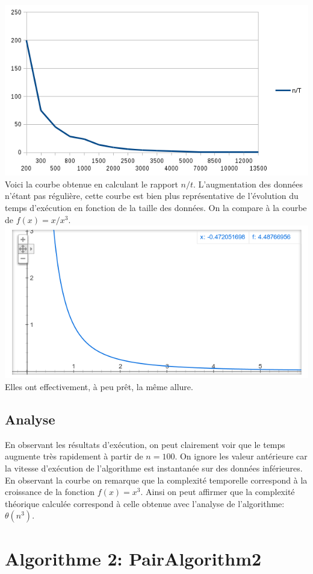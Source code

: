 \documentclass[a4paper, 12pt]{article}
\begin{document}
\begin{minipage}[c]{0.6\linewidth}
	\includegraphics[scale=0.6]{curve_algo_1.png}
 	Voici la courbe obtenue en calculant le rapport $n/t$. L'augmentation des données n'étant pas régulière, cette courbe est bien plus représentative de l'évolution du temps d'exécution en fonction de la taille des données.
 	On la compare à la courbe de $f(x)=x/x^3$.
 	\includegraphics[scale=0.4]{x_x3.png}
 	Elles ont effectivement, à peu prêt, la même allure. 
\end{minipage}
\subsection{Analyse}
En observant les résultats d’exécution, on peut clairement voir que le temps augmente très rapidement à partir de $n=100$. On ignore les valeur antérieure car la vitesse d’exécution de l'algorithme est instantanée sur des données inférieures. En observant la courbe on remarque que la complexité temporelle correspond à la croissance de la fonction $f(x) = x^3$. Ainsi on peut affirmer que la complexité théorique calculée correspond à celle obtenue avec l'analyse de l'algorithme: $\theta (n^3)$.
\section{Algorithme 2: PairAlgorithm2}
\end{document}
